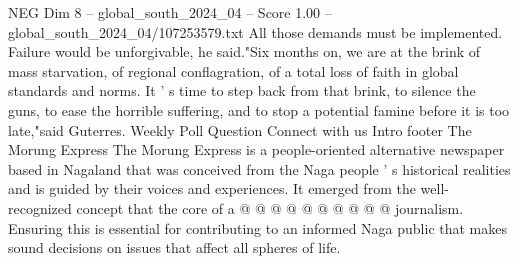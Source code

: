 \begin{textsample}{NEG Dim 8 – global\_south\_2024\_04 – Score 1.00 – global\_south\_2024\_04/107253579.txt}
All those demands must be implemented.
Failure would be unforgivable, he said."Six months on, we are at the brink of mass starvation, of regional conflagration, of a total loss of faith in global standards and norms.
It ' s time to step back from that brink, to silence the guns, to ease the horrible suffering, and to stop a potential famine before it is too late,"said Guterres.
Weekly Poll Question Connect with us Intro footer The Morung Express The Morung Express is a people-oriented alternative newspaper based in Nagaland that was conceived from the Naga people ' s historical realities and is guided by their voices and experiences.
It emerged from the well-recognized concept that the core of a @ @ @ @ @ @ @ @ @ @ journalism.
Ensuring this is essential for contributing to an informed Naga public that makes sound decisions on issues that affect all spheres of life.

\end{textsample}
